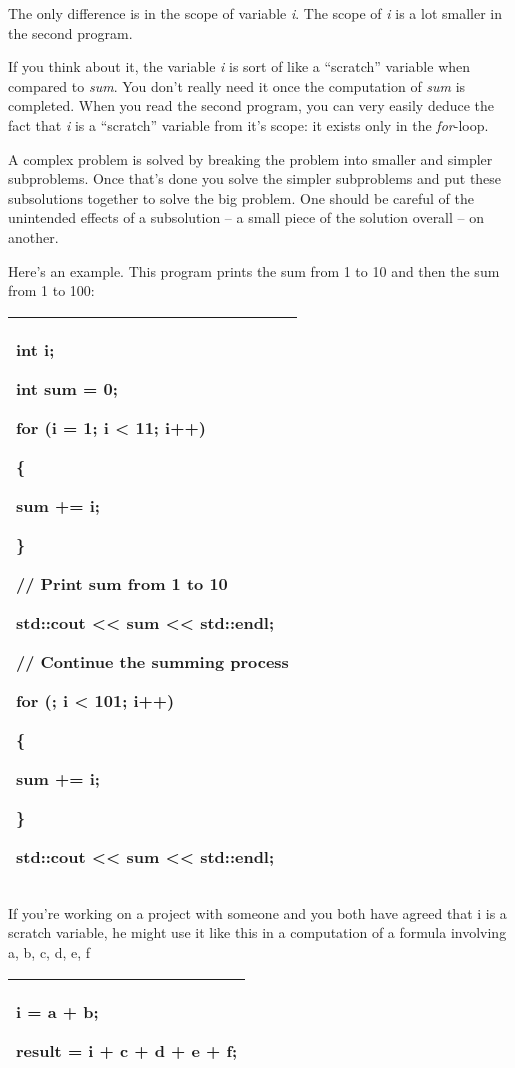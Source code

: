 \documentclass[
]{article}
\begin{document}
The only difference is in the scope of variable \emph{i}. The scope of
\emph{i} is a lot smaller in the second program.

If you think about it, the variable \emph{i} is sort of like a
``scratch'' variable when compared to \emph{sum}. You don't really need
it once the computation of \emph{sum} is completed. When you read the
second program, you can very easily deduce the fact that \emph{i} is a
``scratch'' variable from it's scope: it exists only in the
\emph{for}-loop.

A complex problem is solved by breaking the problem into smaller and
simpler subproblems. Once that's done you solve the simpler subproblems
and put these subsolutions together to solve the big problem. One should
be careful of the unintended effects of a subsolution -- a small piece
of the solution overall -- on another.

Here's an example. This program prints the sum from 1 to 10 and then the
sum from 1 to 100:

\begin{longtable}[]{@{}l@{}}
\toprule
\endhead
\begin{minipage}[t]{0.97\columnwidth}\raggedright
int i;

int sum = 0;

for (i = 1; i \textless{} 11; i++)

\{

sum += i;

\}

// Print sum from 1 to 10

std::cout \textless\textless{} sum \textless\textless{} std::endl;

// Continue the summing process

for (; i \textless{} 101; i++)

\{

sum += i;

\}

std::cout \textless\textless{} sum \textless\textless{} std::endl;\strut
\end{minipage}\tabularnewline
\bottomrule
\end{longtable}

If you're working on a project with someone and you both have agreed
that i is a scratch variable, he might use it like this in a computation
of a formula involving a, b, c, d, e, f

\begin{longtable}[]{@{}l@{}}
\toprule
\endhead
\begin{minipage}[t]{0.97\columnwidth}\raggedright
i = a + b;

result = i + c + d + e + f;\strut
\end{minipage}\tabularnewline
\bottomrule
\end{longtable}
\end{document}
